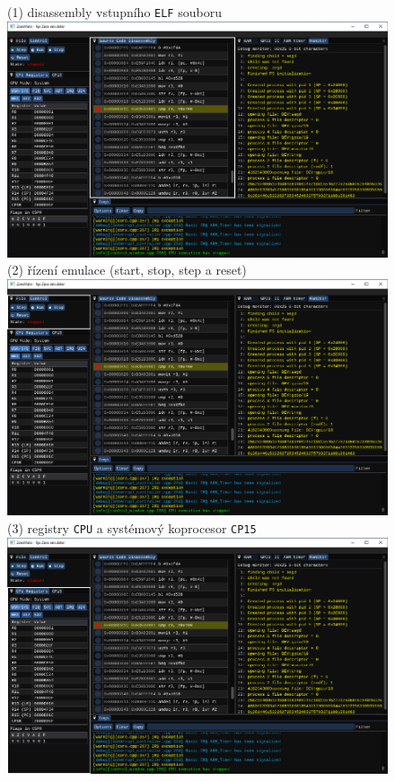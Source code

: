 \documentclass[compress]{beamer}
\begin{document}
\begin{frame}
	\centering \Large
	\begin{overlayarea}{\textwidth}{\textheight}
		\begin{figure}
			\centering
			{%
				\normalsize \textcolor{UBCblue}{(1) disassembly vstupního \texttt{ELF} souboru}\\
				\vspace{0.1cm}
				\includegraphics[width=.85\textwidth]{img/gui/01.pdf}%
			}%
			\only<2>
			{%
				\normalsize \textcolor{UBCblue}{(2) řízení emulace (start, stop, step a reset)}\\
				\vspace{0.1cm}
				\includegraphics[width=.85\textwidth]{img/gui/02.pdf}%
			}%
			\only<3>
			{%
				\normalsize \textcolor{UBCblue}{(3) registry \texttt{CPU} a systémový koprocesor \texttt{CP15}}\\
				\vspace{0.1cm}
				\includegraphics[width=.85\textwidth]{img/gui/03.pdf}%
}
\end{figure}
\end{overlayarea}
\end{frame}
\end{document}
